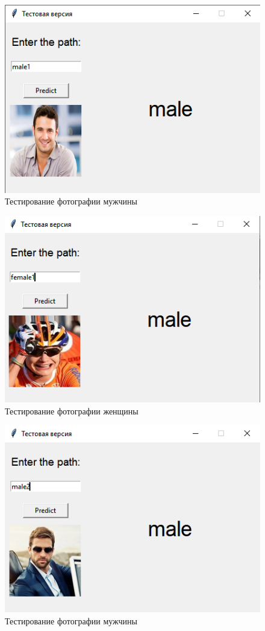 \begin{figure}[!h] 
  \center
  \includegraphics [scale=1.2] {img/testmale2.png}
  \caption{Тестирование фотографии мужчины} 
  \label{fig:10}  
\end{figure}

\begin{figure}[!h] 
  \center
  \includegraphics [scale=1.2] {img/testfemale2.png}
  \caption{Тестирование фотографии женщины} 
  \label{fig:11}  
\end{figure}
\begin{figure}[!h] 
  \center
  \includegraphics [scale=1.2] {img/testmale3.png}
  \caption{Тестирование фотографии мужчины} 
  \label{fig:12}  
\end{figure}

